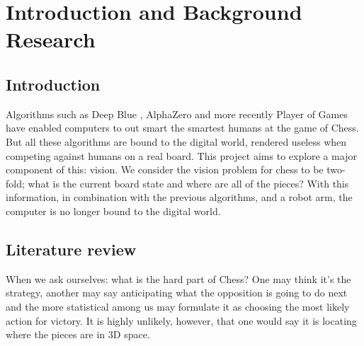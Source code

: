 \chapter{Introduction and Background Research}

\label{chapter1}

\section{Introduction}

Algorithms such as Deep Blue \cite{parikh1980adaptive}, AlphaZero \cite{} and more recently Player of Games\cite{}
have enabled computers to out smart the smartest humans at the game of Chess.
But all these algorithms are bound to the digital world, rendered useless when
competing against humans on a real board. This project aims to explore a major
component of this: vision.
We consider the vision problem for chess to be two-fold; what is the current board
state and where are all of the pieces?  With this information, in combination with the
previous algorithms, and a robot arm, the computer is no longer bound to the
digital world.

\section{Literature review}
\label{research}
When we ask ourselves: what is the hard part of Chess?  
One may think it's the strategy, another may say anticipating what the opposition
is going to do next and the more statistical among us may formulate it as choosing the most likely action for victory.  
It is highly unlikely, however, that one would say it is locating where the pieces are in 3D space.

